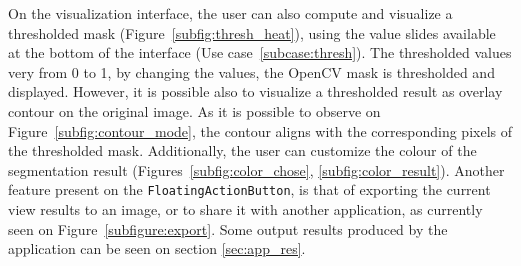 On the visualization interface, the user can also compute and visualize a thresholded mask (Figure~\ref{subfig:thresh_heat}), using the value slides available at the bottom of the interface (Use case~\ref{subcase:thresh}). The thresholded values very from 0 to 1, by changing the values, the OpenCV mask is thresholded and displayed. However, it is possible also to visualize a thresholded result as overlay contour on the original image. As it is possible to observe on Figure~\ref{subfig:contour_mode}, the contour aligns with the corresponding pixels of the thresholded mask. Additionally, the user can customize the colour of the segmentation result (Figures~\ref{subfig:color_chose}, \ref{subfig:color_result}). Another feature present on the \texttt{FloatingActionButton}, is that of exporting the current view results to an image, or to share it with another application, as currently seen on Figure~\ref{subfigure:export}. Some output results produced by the application can be seen on section \ref{sec:app_res}.

